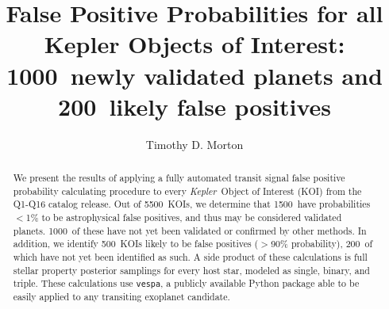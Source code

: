 \documentclass[preprint2]{aastex}
\newcommand{\ntotal}{5500}
\newcommand{\nval}{1500}
\newcommand{\nvalnew}{1000}
\newcommand{\nfp}{500}
\newcommand{\nfpnew}{200}
\newcommand{\kepler}{\textit{Kepler}}
\newcommand{\vespa}{\texttt{vespa}}
\begin{document}

\title{False Positive Probabilities for all Kepler Objects of Interest: \\
        \nvalnew\ newly validated planets and \nfpnew\ likely false positives}


\author{Timothy D. Morton}



\begin{abstract}
We present the results of applying a fully automated transit signal
false positive probability calculating procedure to every
\kepler\ Object of Interest (KOI) from the Q1-Q16 catalog release.
Out of \ntotal\ KOIs, we determine that \nval\ have probabilities
$<$1\% to be astrophysical false positives, and thus may be considered
validated planets.  \nvalnew\ of these have not yet been validated or
confirmed by other methods.  In addition, we identify \nfp\ KOIs
likely to be false positives ($>$90\% probability), \nfpnew\ of which
have not yet been identified as such. A side product of these
calculations is full stellar property posterior samplings for every
host star, modeled as single, binary, and triple.  These calculations
use \vespa, a publicly available Python package able to be easily
applied to any transiting exoplanet candidate.
\end{abstract}

\end{document}
